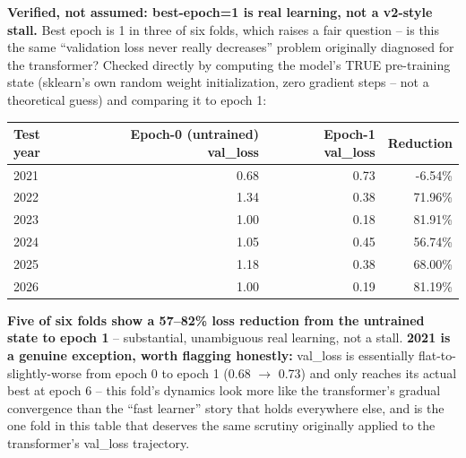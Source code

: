 \documentclass[11pt]{article}
\begin{document}
\textbf{Verified, not assumed: best-epoch=1 is real learning, not a v2-style stall.} Best epoch is 1 in
three of six folds, which raises a fair question -- is this the same ``validation loss never really
decreases'' problem originally diagnosed for the transformer? Checked directly by computing the model's
TRUE pre-training state (sklearn's own random weight initialization, zero gradient steps -- not a
theoretical guess) and comparing it to epoch 1:
\begin{table}[H]
\centering
\begin{tabular}{lrrr}
\toprule
Test year & Epoch-0 (untrained) val\_loss & Epoch-1 val\_loss & Reduction \\
\midrule
2021 & 0.68 & 0.73 & -6.54\% \\
2022 & 1.34 & 0.38 & 71.96\% \\
2023 & 1.00 & 0.18 & 81.91\% \\
2024 & 1.05 & 0.45 & 56.74\% \\
2025 & 1.18 & 0.38 & 68.00\% \\
2026 & 1.00 & 0.19 & 81.19\% \\
\bottomrule
\end{tabular}
\end{table}
\textbf{Five of six folds show a 57--82\% loss reduction from the untrained state to epoch 1} -- substantial,
unambiguous real learning, not a stall. \textbf{2021 is a genuine exception, worth flagging honestly:}
val\_loss is essentially flat-to-slightly-worse from epoch 0 to epoch 1 (0.68 $\to$ 0.73) and only reaches
its actual best at epoch 6 -- this fold's dynamics look more like the transformer's gradual convergence
than the ``fast learner'' story that holds everywhere else, and is the one fold in this table that
deserves the same scrutiny originally applied to the transformer's val\_loss trajectory.
\end{document}
